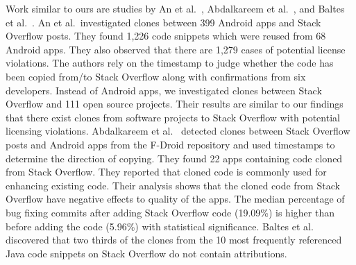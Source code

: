 \documentclass[10pt,journal,compsoc]{IEEEtran}
\begin{document}
Work similar to ours are studies by An et al.~\cite{An2017},
Abdalkareem et al.~\cite{Abdalkareem2017}, and Baltes et al.~\cite{Baltes2017}. 
An et al.~investigated clones
between 399 Android apps and Stack Overflow posts. They found 1,226 code
snippets which were reused from 68 Android apps. They also observed that there
are 1,279 cases of potential license violations. The authors rely on the
timestamp to judge whether the code has been copied from/to Stack Overflow along
with confirmations from six developers. Instead of Android apps, we investigated
clones between Stack Overflow and 111 open source projects. Their results are
similar to our findings that there exist clones from software projects to Stack
Overflow with potential licensing violations. Abdalkareem et
al.~\cite{Abdalkareem2017} detected clones between Stack Overflow posts and
Android apps from the F-Droid repository and used timestamps to
determine the direction
of copying. They found 22 apps containing code cloned from Stack Overflow. They
reported that cloned code is commonly used for enhancing existing code. Their
analysis shows that the cloned code from Stack Overflow have negative effects to
quality of the apps. The median percentage of bug fixing commits after adding
Stack Overflow code (19.09\%) is higher than before adding the code (5.96\%)
with statistical significance.
Baltes et al.~\cite{Baltes2017} discovered that two
thirds of the clones from the 10 most frequently referenced Java code snippets on Stack
Overflow do not contain attributions.
\end{document}
